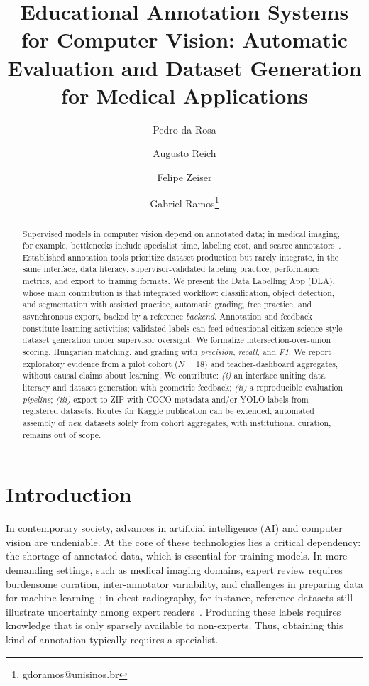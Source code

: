\documentclass[runningheads]{llncs}
\title{Educational Annotation Systems for Computer Vision: Automatic Evaluation and Dataset Generation for Medical Applications}
\author{Pedro da Rosa\inst{1} \and
Augusto Reich\inst{1} \and
Felipe Zeiser\inst{1} \and
Gabriel Ramos\thanks{gdoramos@unisinos.br}\inst{1}
}
\institute{Graduate Program in Applied Computing, Universidade Do Vale Do Rio dos Sinos
\email{\{pedrorosa10@edu.,reichaugusto@edu., felipezeiser@, gdoramos@\}unisinos.br}}
\begin{document}
\maketitle

\begin{abstract}
Supervised models in computer vision depend on annotated data; in medical imaging, for example, bottlenecks include specialist time, labeling cost, and scarce annotators~\cite{willemink2020preparing,esteva2017dermatologist}. Established annotation tools prioritize dataset production but rarely integrate, in the same interface, data literacy, supervisor-validated labeling practice, performance metrics, and export to training formats. We present the Data Labelling App (DLA), whose main contribution is that integrated workflow: classification, object detection, and segmentation with assisted practice, automatic grading, free practice, and asynchronous export, backed by a reference \emph{backend}. Annotation and feedback constitute learning activities; validated labels can feed educational citizen-science-style dataset generation under supervisor oversight. We formalize intersection-over-union scoring, Hungarian matching, and grading with \emph{precision}, \emph{recall}, and \emph{F1}. We report exploratory evidence from a pilot cohort ($N=18$) and teacher-dashboard aggregates, without causal claims about learning. We contribute: \emph{(i)} an interface uniting data literacy and dataset generation with geometric feedback; \emph{(ii)} a reproducible evaluation \textit{pipeline}; \emph{(iii)} export to ZIP with COCO metadata and/or YOLO labels from registered datasets. Routes for Kaggle publication can be extended; automated assembly of \emph{new} datasets solely from cohort aggregates, with institutional curation, remains out of scope.

\end{abstract}
\section{Introduction}

In contemporary society, advances in artificial intelligence (AI) and computer vision are undeniable. At the core of these technologies lies a critical dependency: the shortage of annotated data, which is essential for training models. In more demanding settings, such as medical imaging domains, expert review requires burdensome curation, inter-annotator variability, and challenges in preparing data for machine learning~\cite{willemink2020preparing}; in chest radiography, for instance, reference datasets still illustrate uncertainty among expert readers~\cite{irvin2019chexpert}. Producing these labels requires knowledge that is only sparsely available to non-experts. Thus, obtaining this kind of annotation typically requires a specialist.
\end{document}

